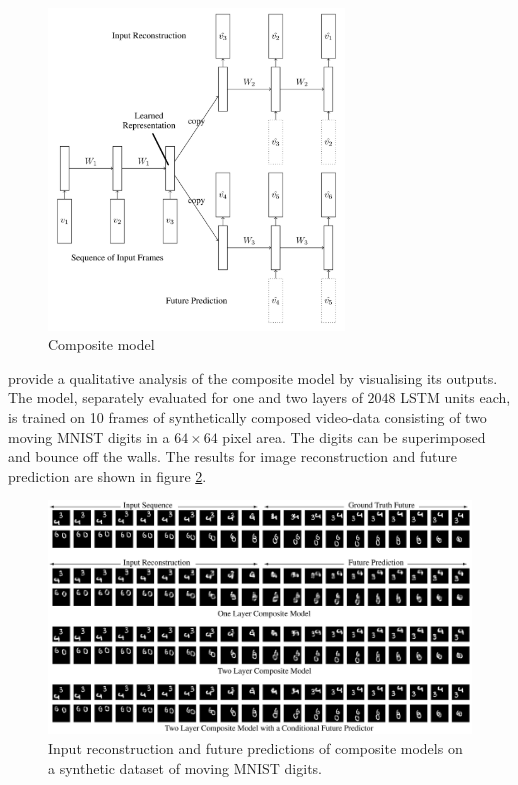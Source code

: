 \begin{figure}[H]
    \centering
    \includegraphics[width=0.7\textwidth]{img_deep/unsupervisedlstms_composite}
    \caption{Composite model \cite{srivastava_unsupervised_2015}}
    \label{fig:unsupervisedlstms_composite}
\end{figure}

\textcite{srivastava_unsupervised_2015} provide a qualitative analysis of the composite model by visualising its outputs.
The model, separately evaluated for one and two layers of $2048$ LSTM units each, is trained on 10 frames of synthetically composed video-data consisting of two moving MNIST digits in a $64 \times 64$ pixel area.
The digits can be superimposed and bounce off the walls.
The results for image reconstruction and future prediction are shown in figure \ref{fig:unsupervisedlstms_movingmnist}.

\begin{figure}[H]
    \centering
    \includegraphics[width=\textwidth]{img_deep/unsupervisedlstms_movingmnist}
    \caption{Input reconstruction and future predictions of composite models on a synthetic dataset of moving MNIST digits. \cite{srivastava_unsupervised_2015}}
    \label{fig:unsupervisedlstms_movingmnist}
\end{figure}

